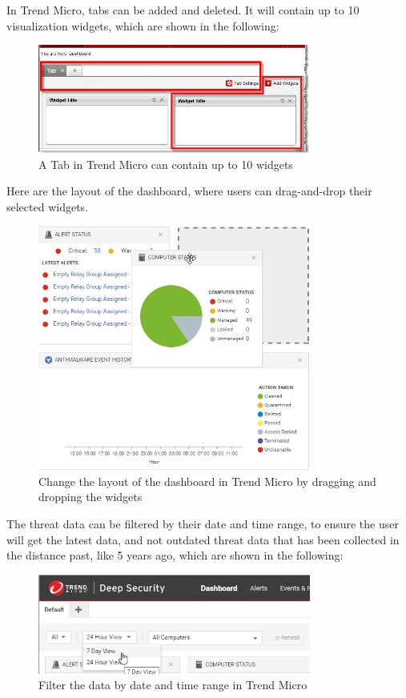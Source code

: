 In Trend Micro, tabs can be added and deleted. It will contain up to 10 visualization widgets, which are shown
in the following:

\begin{figure}[H]
      \centering
      \includegraphics[width=0.8\textwidth]{Figures/Trend Micro/tABS.jpg}
      \caption{A Tab in Trend Micro can contain up to 10 widgets}
\end{figure}

Here are the layout of the dashboard, where users can drag-and-drop their selected widgets.

\begin{figure}[H]
      \centering
      \includegraphics[width=0.8\textwidth]{Figures/Trend Micro/darg-and-drop.png}
      \caption{Change the layout of the dashboard in Trend Micro by dragging and dropping the widgets}
\end{figure}

The threat data can be filtered by their date and time range, to ensure the user will get the latest data,
and not outdated threat data that has been collected in the distance past, like 5 years ago, which
are shown in the following:

\begin{figure}[H]
      \centering
      \includegraphics[width=0.8\textwidth]{Figures/Trend Micro/date-time-range.png}
      \caption{Filter the data by date and time range in Trend Micro}
\end{figure}

